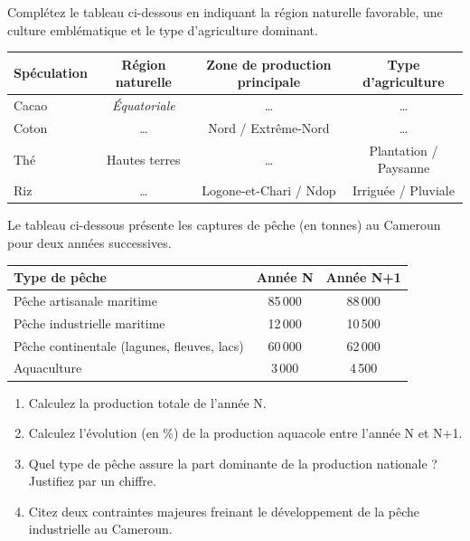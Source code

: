 \documentclass[11pt]{article}
\begin{document}
\begin{exercice}
Complétez le tableau ci-dessous en indiquant la région naturelle favorable, une culture emblématique et le type d'agriculture dominant.

\begin{tabularx}{\linewidth}{|X|c|c|c|}
\hline
\textbf{Spéculation} & \textbf{Région naturelle} & \textbf{Zone de production principale} & \textbf{Type d'agriculture} \\
\hline
Cacao & \textit{Équatoriale} & \dots & \dots \\
\hline
Coton & \dots & Nord / Extrême-Nord & \dots \\
\hline
Thé & Hautes terres & \dots & Plantation / Paysanne \\
\hline
Riz & \dots & Logone-et-Chari / Ndop & Irriguée / Pluviale \\
\hline
\end{tabularx}
\end{exercice}

\begin{exercice}
Le tableau ci-dessous présente les captures de pêche (en tonnes) au Cameroun pour deux années successives.

\begin{center}
\begin{tabular}{|l|c|c|}
\hline
\textbf{Type de pêche} & \textbf{Année N} & \textbf{Année N+1} \\
\hline
Pêche artisanale maritime & 85\,000 & 88\,000 \\
\hline
Pêche industrielle maritime & 12\,000 & 10\,500 \\
\hline
Pêche continentale (lagunes, fleuves, lacs) & 60\,000 & 62\,000 \\
\hline
Aquaculture & 3\,000 & 4\,500 \\
\hline
\end{tabular}
\end{center}

\begin{enumerate}
    \item Calculez la production totale de l'année N.
    \item Calculez l'évolution (en \%) de la production aquacole entre l'année N et N+1.
    \item Quel type de pêche assure la part dominante de la production nationale ? Justifiez par un chiffre.
    \item Citez deux contraintes majeures freinant le développement de la pêche industrielle au Cameroun.
\end{enumerate}
\end{exercice}
\end{document}
